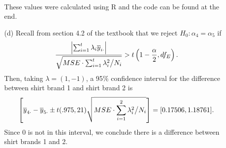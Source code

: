 \documentclass[11pt]{article}
\begin{document}
\begin{itemize}
\begin{itemize}
\begin{align*}
\end{align*}
These values were calculated using R and the code can be found at the end.
\item[(d)]  Recall from section 4.2 of the textbook that we reject $H_0\colon \alpha_4 = \alpha_5$ if
\[
\frac{\left| \sum_{i=1}^t\lambda_i\overline{y}_{i\cdot} \right|}{\sqrt{MSE\cdot\sum_{i=1}^t\lambda_i^2\big{/}N_i}} > t\left(1-\frac{\alpha}{2},df_E\right).
\]
Then, taking $\lambda = (1,-1)$, a 95$\%$ confidence interval for the difference between shirt brand 1 and shirt brand 2 is
\[
\left[\overline{y}_{4\cdot} - \overline{y}_{5\cdot} \pm t(.975, 21)\sqrt{MSE\cdot\sum_{i=1}^2\lambda_i^2 \big{/}N_i} \right] = [0.17506, 1.18761].
\]
Since 0 is not in this interval, we conclude there is a difference between shirt brands 1 and 2.
\end{itemize}
\end{itemize}
\end{document}
